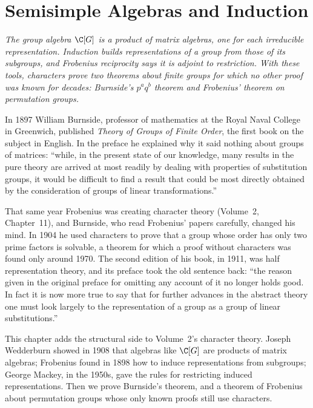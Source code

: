 \chapter{Semisimple Algebras and Induction}

\begin{center}\itshape
The group algebra $\C[G]$ is a product of matrix algebras, one for each irreducible representation. Induction builds representations of a group from those of its subgroups, and Frobenius reciprocity says it is
adjoint to restriction. With these tools, characters prove two theorems about finite groups for which no other proof was known for decades: Burnside's $p^aq^b$ theorem and Frobenius' theorem on permutation groups.
\end{center}

In 1897 William Burnside, professor of mathematics at the Royal Naval College in Greenwich, published \emph{Theory of Groups of Finite Order}, the first book on the subject in English.
In the preface he explained why it said nothing about groups of matrices: ``while, in the present state of our knowledge, many results in the pure theory are arrived at most readily by dealing with properties of
substitution groups, it would be difficult to find a result that could be most directly obtained by the consideration of groups of linear transformations.''

That same year Frobenius was creating character theory (Volume~2, Chapter~11), and Burnside, who read Frobenius' papers carefully, changed his mind. In 1904 he used characters to prove that a group whose order has only
two prime factors is solvable, a theorem for which a proof without characters was found only around 1970. The second edition of his book, in 1911, was half representation theory, and its preface took the old
sentence back: ``the reason given in the original preface for omitting any account of it no longer holds good. In fact it is now more true to say that for further advances in the abstract theory one must look largely to the
representation of a group as a group of linear substitutions.''

This chapter adds the structural side to Volume~2's character theory. Joseph Wedderburn showed in 1908 that algebras like $\C[G]$ are products of matrix algebras; Frobenius found in 1898 how to induce representations from
subgroups; George Mackey, in the 1950s, gave the rules for restricting induced representations. Then we prove Burnside's theorem, and a theorem of Frobenius about permutation groups whose only known proofs still use
characters.

